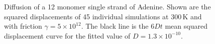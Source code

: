 \begin{figure}[htb]
       \begin{center}
               \scalebox{0.9}{
                        \nonstopmode
                        
                        \errorstopmode
                        \rule[-0.5cm]{0cm}{0cm}}
                \caption{Diffusion of a 12 monomer single strand of Adenine. Shown are the squared displacements of 45 individual simulations at 300\,K and with friction $\gamma = 5 \times 10^{12}$. The black line is the $6Dt$ mean squared displacement curve for the fitted value of $D = 1.3 \times 10^{-10}$.}
		\label{diffusion}
        \end{center}
\end{figure}

